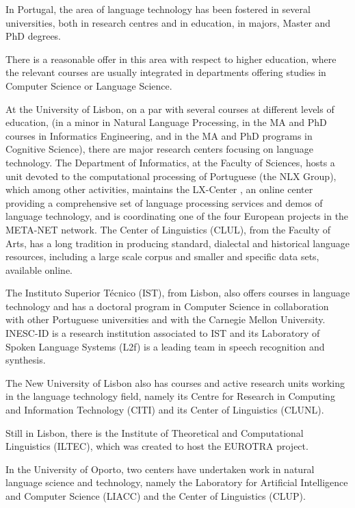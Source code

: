 \begin{multicols}{2}
In Portugal, the area of language technology has been fostered in several universities, both in research centres and in education, in majors, Master and PhD degrees. 

There is a reasonable offer in this area with respect to higher education, where the relevant courses are usually integrated in departments 
offering studies in Computer Science or Language Science.

At the University of Lisbon, on a par with several courses at different levels of education, 
(in a minor in Natural Language Processing,
in the MA and PhD courses in Informatics Engineering,
and in the MA and PhD programs in Cognitive Science), 
there are major research centers focusing on language technology. 
The Department of Informatics, at the Faculty of Sciences, hosts a unit devoted to the computational processing of Portuguese (the NLX Group),
which among other activities, maintains the LX-Center \cite{lxcenter}, an online center providing a comprehensive 
set of language processing services and demos of language technology, and is coordinating
one of the four European projects in the META-NET network.
The Center of Linguistics (CLUL), from the Faculty of Arts, has a long tradition in producing standard, 
dialectal and historical language resources, including a large scale corpus and smaller and specific data sets, 
available online. 

The Instituto Superior Técnico (IST), from Lisbon, also offers courses in language technology and has a doctoral program 
in Computer Science in collaboration with other Portuguese universities and with the Carnegie Mellon University. 
INESC-ID is a research institution associated to IST and its Laboratory of Spoken Language Systems (L2f) 
is a leading team in speech recognition and synthesis. 

The New University of Lisbon also has courses and active research units working in the language technology field, 
namely its Centre for Research in Computing and Information Technology (CITI) and its Center of Linguistics (CLUNL).

Still in Lisbon, there is the Institute of Theoretical and Computational Linguistics (ILTEC), which was created to host the EUROTRA project. 

In the University of Oporto, two centers have undertaken work in natural language science and technology,
namely the Laboratory for Artificial Intelligence and Computer Science (LIACC) and the Center of Linguistics (CLUP).


\end{multicols}
